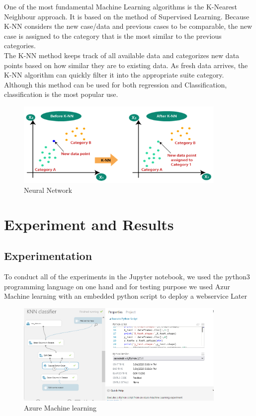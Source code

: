     One of the most fundamental Machine Learning algorithms is the K-Nearest Neighbour approach. It is based on the method of
     Supervised Learning. Because K-NN considers the new case/data and previous cases to be comparable, the new case is assigned to the category that is the most similar to the previous categories.
\\
The K-NN method keeps track of all available data and categorizes new data points based on how similar they are to existing data. As fresh data arrives,
 the K-NN algorithm can quickly filter it into the appropriate suite category. Although this method can be used for both regression and Classification, classification is the most popular use.

    \begin{figure}[htp]
        \centering
        \includegraphics[width=0.9\textwidth]{images/KNN.png }
        \caption{Neural Network }
        \label{fig:example4}
    \end{figure}

\section{Experiment and Results}
\label{chap:Experiment and Results}

\subsection{Experimentation}
\label{sec:Experimentation}

To conduct all of the experiments in 
the Jupyter notebook, we used the python3 programming language on one hand and for testing purpose we used Azur Machine learning with an embedded  python script
 to deploy a webservice Later
\begin{figure}[htp]
    \centering
    \includegraphics[width=0.9\textwidth]{images/azure.png}
    \caption{Azure Machine learning }
    \label{fig:example4}
\end{figure}

